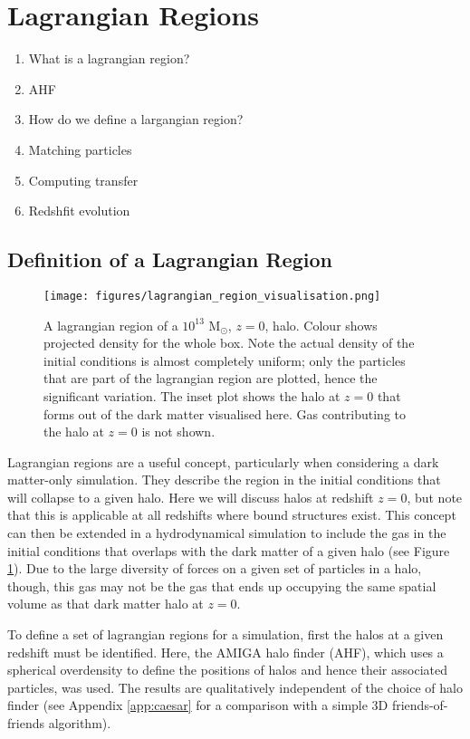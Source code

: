 \section{Lagrangian Regions}

\begin{enumerate}
    \item What is a lagrangian region?
    \item AHF
    \item How do we define a largangian region?
    \item Matching particles
    \item Computing transfer
    \item Redshfit evolution
\end{enumerate}

\subsection{Definition of a Lagrangian Region}

\begin{figure}
    \centering
    \texttt{[image: figures/lagrangian\_region\_visualisation.png]}
    \caption{A lagrangian region of a $10^{13}$ $\mathrm{M}_\odot$, $z=0$, halo. Colour shows projected density for the whole box. Note the actual density of the initial conditions is almost completely uniform; only the particles that are part of the lagrangian region are plotted, hence the significant variation. The inset plot shows the halo at $z=0$ that forms out of the dark matter visualised here. Gas contributing to the halo at $z=0$ is not shown.}
    \label{fig:lrpic}
\end{figure}

Lagrangian regions are a useful concept, particularly when considering a dark matter-only simulation. They describe the region in the initial conditions that will collapse to a given halo. Here we will discuss halos at redshift $z=0$, but note that this is applicable at all redshifts where bound structures exist. This concept can then be extended in a hydrodynamical simulation to include the gas in the initial conditions that overlaps with the dark matter of a given halo (see Figure \ref{fig:lrpic}). Due to the large diversity of forces on a given set of particles in a halo, though, this gas may not be the gas that ends up occupying the same spatial volume as that dark matter halo at $z=0$.

To define a set of lagrangian regions for a simulation, first the halos at a given redshift must be identified. Here, the AMIGA halo finder (AHF), which uses a spherical overdensity to define the positions of halos and hence their associated particles, was used. The results are qualitatively independent of the choice of halo finder (see Appendix \ref{app:caesar} for a comparison with a simple 3D friends-of-friends algorithm).

